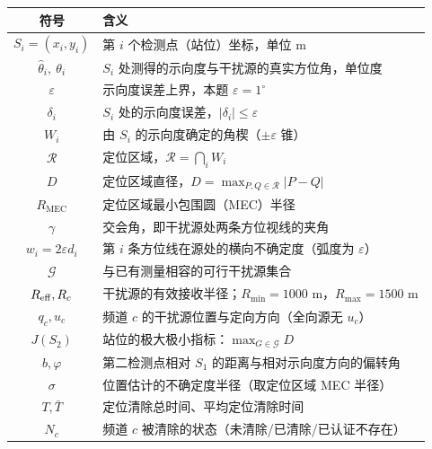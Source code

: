 \documentclass[withoutpreface,bwprint]{cumcmthesis}
\begin{document}
\begin{center}
\begin{longtable}{cl}
\toprule
符号 & 含义\\
\midrule
\endhead
$S_i=(x_i,y_i)$ & 第 $i$ 个检测点（站位）坐标，单位 m\\
$\hat\theta_i,\ \theta_i$ & $S_i$ 处测得的示向度与干扰源的真实方位角，单位度\\
$\varepsilon$ & 示向度误差上界，本题 $\varepsilon=1^{\circ}$\\
$\delta_i$ & $S_i$ 处的示向度误差，$|\delta_i|\le\varepsilon$\\
$W_i$ & 由 $S_i$ 的示向度确定的角楔（$\pm\varepsilon$ 锥）\\
$\mathcal{R}$ & 定位区域，$\mathcal{R}=\bigcap_i W_i$\\
$D$ & 定位区域直径，$D=\max_{P,Q\in\mathcal{R}}|P-Q|$\\
$R_{\mathrm{MEC}}$ & 定位区域最小包围圆（MEC）半径\\
$\gamma$ & 交会角，即干扰源处两条方位视线的夹角\\
$w_i=2\varepsilon d_i$ & 第 $i$ 条方位线在源处的横向不确定度（弧度为 $\varepsilon$）\\
$\mathcal{G}$ & 与已有测量相容的可行干扰源集合\\
$R_{\rm eff},R_c$ & 干扰源的有效接收半径；$R_{\min}=1000$ m，$R_{\max}=1500$ m\\
$q_c,u_c$ & 频道 $c$ 的干扰源位置与定向方向（全向源无 $u_c$）\\
$J(S_2)$ & 站位的极大极小指标：$\max_{G\in\mathcal{G}}D$\\
$b,\varphi$ & 第二检测点相对 $S_1$ 的距离与相对示向度方向的偏转角\\
$\sigma$ & 位置估计的不确定度半径（取定位区域 MEC 半径）\\
$T,\bar T$ & 定位清除总时间、平均定位清除时间\\
$N_c$ & 频道 $c$ 被清除的状态（未清除/已清除/已认证不存在）\\
\bottomrule
\end{longtable}
\end{center}
\end{document}
